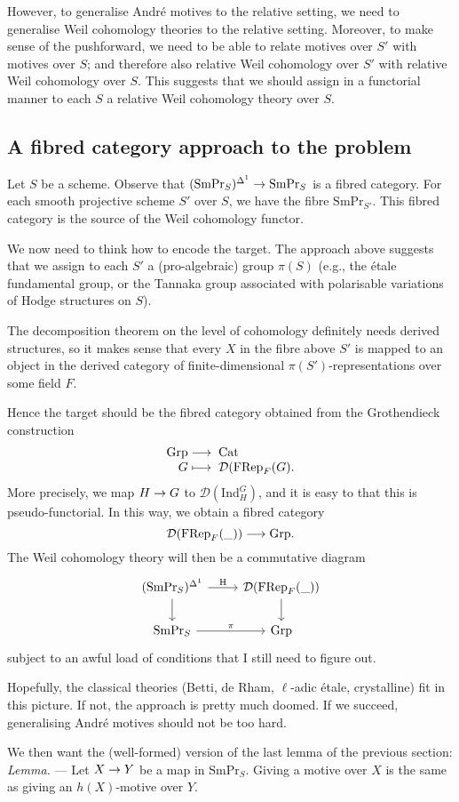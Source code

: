 \documentclass[a4paper,10pt]{article}
\newenvironment{lemma}{\medskip\textit{Lemma.} --- }{}
\def\smpr{\mathrm{SmPr}}
\def\coh{\mathrm{H}}
\begin{document}
However, to generalise Andr\'{e} motives to the relative setting, we need to
generalise Weil cohomology theories to the relative setting. Moreover, to make
sense of the pushforward, we need to be able to relate motives over $S'$ with
motives over $S$; and therefore also relative Weil cohomology over $S'$ with
relative Weil cohomology over $S$. This suggests that we should assign in a
functorial manner to each $S$ a relative Weil cohomology theory over $S$.

\subsection{A fibred category approach to the problem}

Let $S$ be a scheme. Observe that $\map{(\smpr_{S})^{\Delta^{1}}}{\smpr_{S}}$
is a fibred category. For each smooth projective scheme $S'$ over $S$, we have
the fibre $\smpr_{S'}$. This fibred category is the source of the Weil
cohomology functor.

We now need to think how to encode the target. The approach above suggests that
we assign to each $S'$ a (pro-algebraic) group $\pi(S)$ (e.g., the \'{e}tale
fundamental group, or the Tannaka group associated with polarisable variations
of Hodge structures on $S$).

The decomposition theorem on the level of cohomology definitely needs derived
structures, so it makes sense that every $X$ in the fibre above $S'$ is mapped
to an object in the derived category of finite-dimensional
$\pi(S')$-representations over some field $F$.

Hence the target should be the fibred category obtained from the Grothendieck
construction
\[
	\map{\mathrm{Grp}}{\mathrm{Cat}}[G][\mathcal{D}(\mathrm{FRep}_{F}(G).]
\]
More precisely, we map $\map{H}{G}$ to $\mathcal{D}(\mathrm{Ind}^{G}_{H})$, and
it is easy to that this is pseudo-functorial. In this way, we obtain a fibred
category
\[
	\map{\mathcal{D}(\mathrm{FRep}_{F}(\_))}{\mathrm{Grp}}.
\]
The Weil cohomology theory will then be a commutative diagram
\[
	\begin{tikzcd} %
		(\smpr_{S})^{\Delta^{1}} \rar{\coh} \dar &
		\mathcal{D}(\mathrm{FRep}_{F}(\_)) \dar \\
		\smpr_{S} \rar{\pi} & \mathrm{Grp}
	\end{tikzcd} %
\]
subject to an awful load of conditions that I still need to figure out.

Hopefully, the classical theories (Betti, de Rham, $\ell$-adic \'{e}tale,
crystalline) fit in this picture. If not, the approach is pretty much doomed.
If we succeed, generalising Andr\'{e} motives should not be too hard.

We then want the (well-formed) version of the last lemma of the previous
section:
\begin{lemma} %
	Let $\map{X}{Y}$ be a map in $\smpr_{S}$. Giving a motive over $X$ is
	the same as giving an $h(X)$-motive over $Y$.
\end{lemma} %
\end{document}
